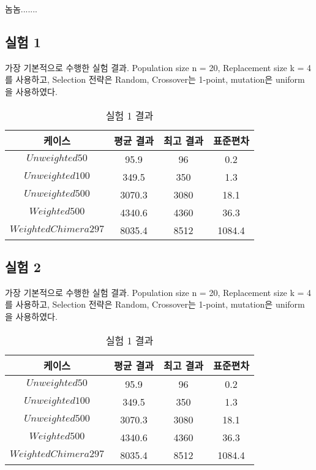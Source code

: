 \documentclass{article}
\begin{document}
놈놈.......

\subsection{실험 1}

가장 기본적으로 수행한 실험 결과. Population size n = 20, Replacement size k = 4를 사용하고, Selection 전략은 Random, Crossover는 1-point, mutation은 uniform 을 사용하였다.



 \begin{table}[h]
 \begin{center}
\caption{실험 1 결과}
\begin{tabular}{cccc}
\hline\hline
케이스 & 평균 결과 & 최고 결과 & 표준편차\\
\hline\hline
$Unweighted 50$ & 95.9 & 96 & 0.2 \\
\hline
$Unweighted 100$ & 349.5 & 350 & 1.3\\
\hline
$Unweighted 500$ & 3070.3 & 3080 & 18.1\\
\hline
$Weighted 500$ & 4340.6 & 4360 & 36.3\\
\hline
$Weighted Chimera 297$ & 8035.4 & 8512 & 1084.4\\
\hline
\end{tabular}
\end{center}
\end{table}

\subsection{실험 2}

가장 기본적으로 수행한 실험 결과. Population size n = 20, Replacement size k = 4를 사용하고, Selection 전략은 Random, Crossover는 1-point, mutation은 uniform 을 사용하였다.



 \begin{table}[h]
 \begin{center}
\caption{실험 1 결과}
\begin{tabular}{cccc}
\hline\hline
케이스 & 평균 결과 & 최고 결과 & 표준편차\\
\hline\hline
$Unweighted 50$ & 95.9 & 96 & 0.2 \\
\hline
$Unweighted 100$ & 349.5 & 350 & 1.3\\
\hline
$Unweighted 500$ & 3070.3 & 3080 & 18.1\\
\hline
$Weighted 500$ & 4340.6 & 4360 & 36.3\\
\hline
$Weighted Chimera 297$ & 8035.4 & 8512 & 1084.4\\
\hline
\end{tabular}
\end{center}
\end{table}
\end{document}
